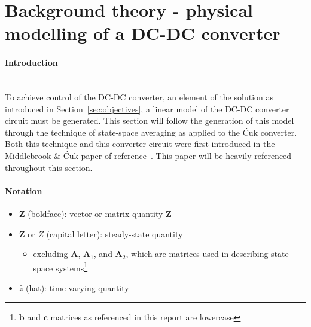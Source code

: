 \section{Background theory - physical modelling of a DC-DC converter}
\paragraph{Introduction}
~\\
To achieve control of the DC-DC converter, an element of the solution as introduced in Section~\ref{sec:objectives}, a linear model of the DC-DC converter circuit must be generated. This section will follow the generation of this model through the technique of state-space averaging as applied to the \'Cuk converter. Both this technique and this converter circuit were first introduced in the Middlebrook \& \'Cuk paper of reference~\cite{cuk}. This paper will be heavily referenced throughout this section.
\paragraph{Notation}
\begin{itemize}
    \item $\boldsymbol{Z}$ (boldface): vector or matrix quantity $\boldsymbol{Z}$
    \item $\boldsymbol{Z}$ or $Z$ (capital letter): steady-state quantity
    \begin{itemize}
        \item excluding $\boldsymbol{A}$, $\boldsymbol{A}_1$, and $\boldsymbol{A}_2$, which are matrices used in describing state-space systems\footnote{$\boldsymbol{b}$ and $\boldsymbol{c}$ matrices as referenced in this report are lowercase}
    \end{itemize}
    \item $\hat{z}$ (hat): time-varying quantity
\end{itemize}
